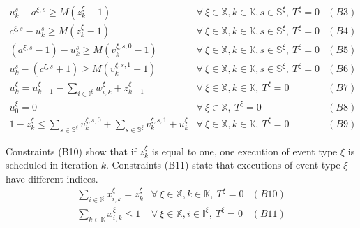 \documentclass[]{interact}
\theoremstyle{plain}%
\theoremstyle{definition}
\theoremstyle{remark}
\begin{document}
\begin{eqnarray}
u^s_k - a^{\xi,s} \ge M(z^{\xi}_{k}-1)&\forall\ \xi\in \mathbb{X},k\in \mathbb{K},s\in \mathbb{S^{\xi}},\ T^{\xi} = 0&(B3)\nonumber\\
c^{\xi,s} - u^s_k \ge M(z^{\xi}_{k}-1)&\forall\ \xi\in \mathbb{X},k\in \mathbb{K},s\in \mathbb{S^{\xi}},\ T^{\xi} = 0&(B4)\nonumber\\
( a^{\xi,s}-1) - u^s_k \ge M(v^{\xi,s,0}_k-1) & \forall\ \xi\in \mathbb{X},k\in \mathbb{K},s\in \mathbb{S^{\xi}},\ T^{\xi} = 0 &(B5)\nonumber\\
u^s_k -  (c^{\xi,s}+1) \ge M(v^{\xi,s,1}_k-1) & \forall\ \xi\in \mathbb{X},k\in \mathbb{K},s\in \mathbb{S^{\xi}},\ T^{\xi} = 0 &(B6)\nonumber\\
u^{\xi}_k = u^{\xi}_{k-1} - \sum_{i\in \mathbb{I}^{\xi}}w^{\xi}_{i,k} + z^{\xi}_{k-1} & \forall\ \xi\in \mathbb{X},k\in \mathbb{K},\ T^{\xi} = 0 &(B7)\nonumber\\
u^{\xi}_{0} = 0&  \forall\ \xi\in \mathbb{X},\ T^{\xi} = 0 &(B8)\nonumber\\
1 - z^{\xi}_{k} \le \sum_{s\in \mathbb{S}^{\xi}} v^{\xi,s,0}_k + \sum_{s\in \mathbb{S}^{\xi}} v^{\xi,s,1}_k+u^{\xi}_k&\forall\ \xi\in \mathbb{X},k\in \mathbb{K},\ T^{\xi} = 0&(B9)\nonumber
\end{eqnarray}

Constraints (B10) show that if $z^{\xi}_k$ is equal to one, one execution of event type ${\xi}$ is scheduled in iteration $k$. Constraints (B11) state that executions of event type ${\xi}$ have different indices.
\begin{eqnarray}
\sum_{i\in \mathbb{I}^{\xi}} x^{\xi}_{i,k} = z^{\xi}_k&\forall\ \xi\in \mathbb{X},k\in \mathbb{K},\ T^{\xi} = 0&(B10)\nonumber\\
\sum_{k\in \mathbb{K}} x^{\xi}_{i,k} \le 1& \forall\ \xi\in \mathbb{X},i\in \mathbb{I}^{\xi},\ T^{\xi} = 0&(B11)\nonumber
\end{eqnarray}
\end{document}
